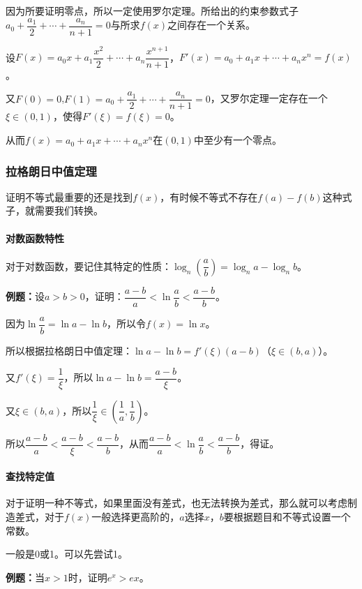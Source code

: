 \documentclass[UTF8, 12pt]{ctexart}
\begin{document}
因为所要证明零点，所以一定使用罗尔定理。所给出的约束参数式子$a_0+\dfrac{a_1}{2}+\cdots+\dfrac{a_n}{n+1}=0$与所求$f(x)$之间存在一个关系。

设$F(x)=a_0x+a_1\dfrac{x^2}{2}+\cdots+a_n\dfrac{x^{n+1}}{n+1}$，$F'(x)=a_0+a_1x+\cdots+a_nx^n=f(x)$。

又$F(0)=0$,$F(1)=a_0+\dfrac{a_1}{2}+\cdots+\dfrac{a_n}{n+1}=0$，又罗尔定理一定存在一个$\xi\in(0,1)$，使得$F'(\xi)=f(\xi)=0$。

从而$f(x)=a_0+a_1x+\cdots+a_nx^n$在$(0,1)$中至少有一个零点。

\subsubsection{拉格朗日中值定理}

证明不等式最重要的还是找到$f(x)$，有时候不等式不存在$f(a)-f(b)$这种式子，就需要我们转换。

\paragraph{对数函数特性} \leavevmode \medskip

对于对数函数，要记住其特定的性质：$\log_n(\dfrac{a}{b})=\log_na-\log_nb$。

\textbf{例题：}设$a>b>0$，证明：$\dfrac{a-b}{a}<\ln\dfrac{a}{b}<\dfrac{a-b}{b}$。

因为$\ln\dfrac{a}{b}=\ln a-\ln b$，所以令$f(x)=\ln x$。

所以根据拉格朗日中值定理：$\ln a-\ln b=f'(\xi)(a-b)$（$\xi\in(b,a)$）。

又$f'(\xi)=\dfrac{1}{\xi}$，所以$\ln a-\ln b=\dfrac{a-b}{\xi}$。

又$\xi\in(b,a)$，所以$\dfrac{1}{\xi}\in(\dfrac{1}{a},\dfrac{1}{b})$。

所以$\dfrac{a-b}{a}<\dfrac{a-b}{\xi}<\dfrac{a-b}{b}$，从而$\dfrac{a-b}{a}<\ln\dfrac{a}{b}<\dfrac{a-b}{b}$，得证。

\paragraph{查找特定值} \leavevmode \medskip

对于证明一种不等式，如果里面没有差式，也无法转换为差式，那么就可以考虑制造差式，对于$f(x)$一般选择更高阶的，$a$选择$x$，$b$要根据题目和不等式设置一个常数。

一般是0或1。可以先尝试1。

\textbf{例题：}当$x>1$时，证明$e^x>ex$。
\end{document}
